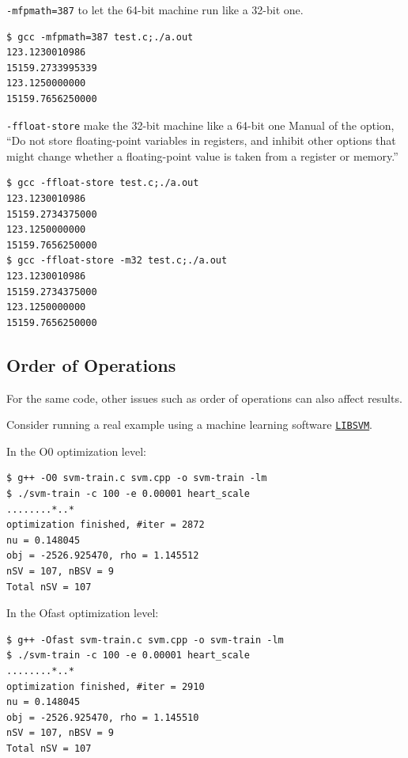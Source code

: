 \begin{eg}
    \texttt{-mfpmath=387} to let the 64-bit machine run like a 32-bit one.
\end{eg}

\begin{verbatim}
$ gcc -mfpmath=387 test.c;./a.out
123.1230010986
15159.2733995339
123.1250000000
15159.7656250000
\end{verbatim}

\begin{eg}
    \texttt{-ffloat-store} make the 32-bit machine like a 64-bit one Manual of the option, ``Do not store floating-point variables in registers, and inhibit other options that might change whether a floating-point value is taken from a register or memory.''
\end{eg}

\begin{verbatim}
$ gcc -ffloat-store test.c;./a.out
123.1230010986
15159.2734375000
123.1250000000
15159.7656250000
$ gcc -ffloat-store -m32 test.c;./a.out
123.1230010986
15159.2734375000
123.1250000000
15159.7656250000
\end{verbatim}

\subsection{Order of Operations}

For the same code, other issues such as order of operations can also affect results.

\begin{eg}
    Consider running a real example using a machine learning software \href{https://www.csie.ntu.edu.tw/~cjlin/libsvm/}{\texttt{LIBSVM}}.
\end{eg}

In the O0 optimization level:

\begin{verbatim}
$ g++ -O0 svm-train.c svm.cpp -o svm-train -lm
$ ./svm-train -c 100 -e 0.00001 heart_scale
........*..*
optimization finished, #iter = 2872
nu = 0.148045
obj = -2526.925470, rho = 1.145512
nSV = 107, nBSV = 9
Total nSV = 107
\end{verbatim}

In the Ofast optimization level:

\begin{verbatim}
$ g++ -Ofast svm-train.c svm.cpp -o svm-train -lm
$ ./svm-train -c 100 -e 0.00001 heart_scale
........*..*
optimization finished, #iter = 2910
nu = 0.148045
obj = -2526.925470, rho = 1.145510
nSV = 107, nBSV = 9
Total nSV = 107
\end{verbatim}

